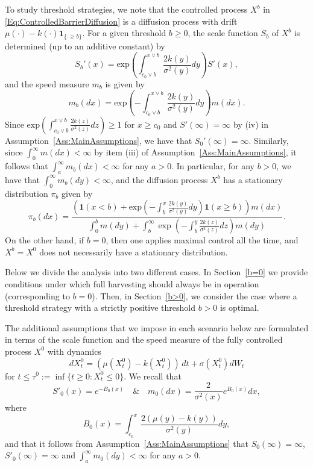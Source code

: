\documentclass[12pt]{article}
\begin{document}
To study threshold strategies, we note that the controlled process $X^b$ in \eqref{Eq:ControlledBarrierDiffusion} is a diffusion process with drift $\mu(\cdot)-k(\cdot)\mathbf 1_{\{\cdot\geq b\}}$. For a given threshold $b\geq 0$, the scale function $S_b$ of $X^b$ is determined (up to an additive constant) by 
\[    S_b'(x)  = 
        \text{exp}\left(\int_{c_0\vee b}^{x\vee b} \frac{2k(y)}{\sigma^2(y)}dy \right) S'(x),
\]
and the speed measure $m_b$ is given by
\begin{equation*}
        m_b(dx) =
         \text{exp}\left(-\int_{c_0\vee b}^{x\vee b}\frac{2k(y)}{\sigma^2(y)}dy \right)m(dx) .
\end{equation*}
Since $\text{exp}\left(\int_{c_0\vee b}^{x\vee b} \frac{2k(z)}{\sigma^2(z)}dz \right) \geq 1$ for $x\geq c_0$ and $S'(\infty)=\infty$ by (iv) in Assumption~\ref{Ass:MainAssumptions}, we have that $S_0'(\infty)=\infty$.
Similarly, since $\int_0^{\infty} m(dx) < \infty$ by item (iii) of Assumption~\ref{Ass:MainAssumptions}, 
it follows that 
$\int_a^\infty m_b(dx)<\infty$ for any $a>0$.
In particular, for any $b>0$, we have that 
$\int_0^\infty m_b(dy)<\infty$, and 
the diffusion process $X^b$ has a stationary distribution $\pi_b$ given by 
\begin{equation} \label{Eq:StationaryDensityControlled2}
    \pi_b(dx) =  \frac{ \left(\mathbf{1}(x<b) + \text{exp}\left(-\int_b^x \frac{2k(y)}{\sigma^2(y)}dy \right) \mathbf{1}(x \geq b) \right)m(dx)}{\int_0^{b}m(dy) + \int_{b}^{\infty}  \exp\left(-\int_b^y \frac{2k(z)}{\sigma^2(z)}dz \right)m(dy)}.
\end{equation}
On the other hand, if $b=0$, then one applies maximal control all the time, and $X^b=X^0$ does not necessarily have a stationary distribution. 

Below we divide the analysis into two different cases. 
In Section~\ref{b=0} we provide conditions under which 
full harvesting should always be in operation (corresponding to $b=0$).
Then, in Section~\ref{b>0}, we consider the case where a threshold strategy with a strictly positive threshold $b > 0$ is optimal.

The additional assumptions that we impose in each scenario below are formulated in terms of the scale function and the speed measure of the fully controlled process $X^0$ with dynamics 
\begin{equation}\label{X0}
    dX^0_t=(\mu(X^0_t)-k(X^0_t))\,dt + \sigma(X^0_t) dW_t
\end{equation}
for $t\leq \tau^0:=\inf\{t\geq 0:X^0_t\leq 0\}$.
We recall that 
\[S'_0(x) = e^{-B_0(x)} \quad\&\quad m_0(dx) = \frac{2}{\sigma^2(x)} e^{B_0(x)}dx,\]
where 
\[B_0(x) = \int_{c_0}^x \frac{2(\mu(y)-k(y))}{\sigma^2(y)}dy,\]
and that it follows from Assumption~\ref{Ass:MainAssumptions} that $S_0(\infty)=\infty$, $S'_0(\infty)=\infty$ and $\int_a^\infty m_0(dy)<\infty$ for any $a>0$.
\end{document}
